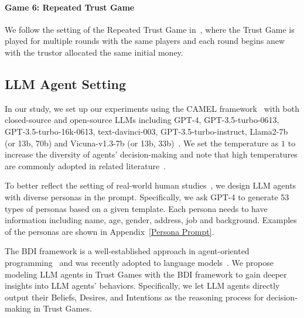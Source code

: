 \vspace{-3mm}
\paragraph{Game 6: Repeated Trust Game} We follow the setting of the Repeated Trust Game in~\citep{cochard2004trusting}, where the Trust Game is played for multiple rounds with the same players and each round begins anew with the trustor allocated the same initial money.



\vspace{-0.15cm}
\subsection{LLM Agent Setting}
\vspace{-0.15cm}
In our study, we set up our experiments using the CAMEL framework~\citep{li2023camel} with both closed-source and open-source LLMs including GPT-4, GPT-3.5-turbo-0613, GPT-3.5-turbo-16k-0613, text-davinci-003, GPT-3.5-turbo-instruct, Llama2-7b (or 13b, 70b) and Vicuna-v1.3-7b (or 13b, 33b)~\citep{instructgpt,openai2023gpt4,touvron2023Llama,vicuna2023}. We set the temperature as $1$ to increase the diversity of agents' decision-making and note that high temperatures are commonly adopted in related literature~\citep{aher2023using,lore2023strategic,guo2023gpt}. 

 To better reflect the setting of real-world human studies~\citep{berg1995trust}, we design LLM agents with diverse personas in the prompt.  Specifically, we ask GPT-4 to generate 53 types of personas based on a given template. Each persona needs to have information including name, age, gender, address, job and background. Examples of the personas are shown in Appendix~\ref{Persona Prompt}.





The BDI framework is a well-established approach in agent-oriented programming~\citep{raoBDIAgentsTheory1995a} and was recently adopted to language models~\citep{andreas-2022-language-BDI}. We propose modeling LLM agents in Trust Games with the BDI framework to gain deeper insights into LLM agents' behaviors. Specifically, we let LLM agents directly output their Beliefs, Desires, and Intentions as the reasoning process for decision-making in Trust Games.





















